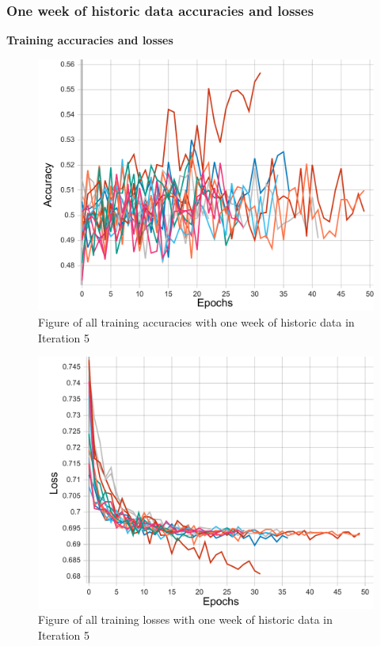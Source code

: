 \subsubsection{One week of historic data accuracies and losses}
\textbf{Training accuracies and losses}
\begin{figure}[ht]
    \centering
    \includegraphics[width=0.575\columnwidth]{figures/results/final/week_acc_t.pdf}
    \caption[Training accuracies for Iteration 5 with one week of historic data]{Figure of all training accuracies with one week of historic data in Iteration 5}
    \label{fig:iteration5_week_train_accuracy}
\end{figure}
\FloatBarrier

\begin{figure}[ht]
    \centering
    \includegraphics[width=0.575\columnwidth]{figures/results/final/week_loss_t.pdf}
    \caption[Training losses for Iteration 5 with one week of historic data]{Figure of all training losses with one week of historic data in Iteration 5}
    \label{fig:iteration5_week_train_loss}
\end{figure}
\FloatBarrier

